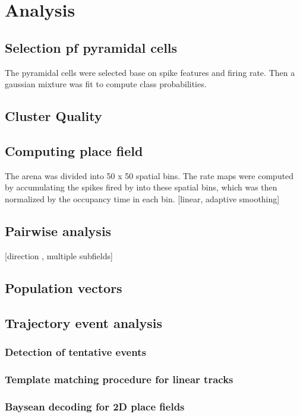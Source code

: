 \section{Analysis}
\label{analysis}

\subsection{Selection pf pyramidal cells}
The pyramidal cells were selected base on spike features and firing rate. 
Then a gaussian mixture was fit to compute class probabilities.

\subsection{Cluster Quality}

\subsection{Computing place field}
The arena was divided into 50 x 50 spatial bins. The rate maps were computed by accumulating the spikes fired by into these spatial bins, which was then normalized by the occupancy time in each bin. 
[linear, adaptive smoothing]

\subsection{Pairwise analysis}
[direction , multiple subfields]

\subsection{Population vectors}

\subsection{Trajectory event analysis}

\subsubsection{Detection of tentative events}

\subsubsection{Template matching procedure for linear tracks}

\subsubsection{Baysean decoding for 2D place fields}

	